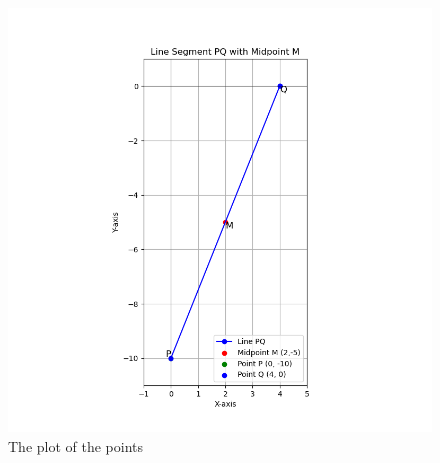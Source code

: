 \documentclass{article}
\begin{document}
\begin{figure}[h!]
  \hspace{0cm}
  \includegraphics[width=1.0\textwidth]{Figure_1.png}
  
  \caption{The plot of the points }
  \label{fig:your_label}
\end{figure}
\end{document}
